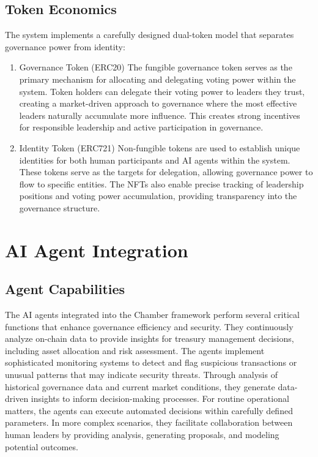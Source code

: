 \documentclass[12pt]{article}
\begin{document}
\subsection{Token Economics}
The system implements a carefully designed dual-token model that separates governance power from identity:

\begin{enumerate}
    \item Governance Token (ERC20)
    The fungible governance token serves as the primary mechanism for allocating and delegating voting power within the system. Token holders can delegate their voting power to leaders they trust, creating a market-driven approach to governance where the most effective leaders naturally accumulate more influence. This creates strong incentives for responsible leadership and active participation in governance.
    
    \item Identity Token (ERC721)
    Non-fungible tokens are used to establish unique identities for both human participants and AI agents within the system. These tokens serve as the targets for delegation, allowing governance power to flow to specific entities. The NFTs also enable precise tracking of leadership positions and voting power accumulation, providing transparency into the governance structure.
\end{enumerate}

\section{AI Agent Integration}

\subsection{Agent Capabilities}
The AI agents integrated into the Chamber framework perform several critical functions that enhance governance efficiency and security. They continuously analyze on-chain data to provide insights for treasury management decisions, including asset allocation and risk assessment. The agents implement sophisticated monitoring systems to detect and flag suspicious transactions or unusual patterns that may indicate security threats. Through analysis of historical governance data and current market conditions, they generate data-driven insights to inform decision-making processes. For routine operational matters, the agents can execute automated decisions within carefully defined parameters. In more complex scenarios, they facilitate collaboration between human leaders by providing analysis, generating proposals, and modeling potential outcomes.
\end{document}
